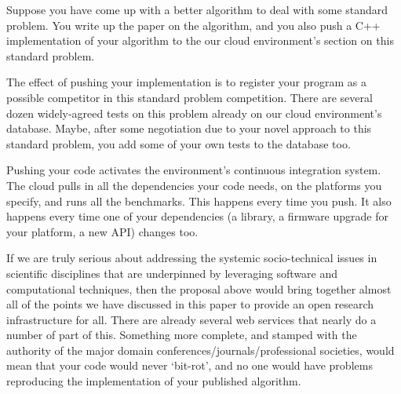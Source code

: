 \documentclass[a4paper,11pt]{article}
\begin{document}
Suppose you have come up with a better
algorithm to deal with some standard problem.  You write up the paper
on the algorithm, and you also push a C++ implementation of your
algorithm to the our cloud environment's section on this standard problem.

The effect of pushing your implementation is to register your program
as a possible competitor in this standard problem competition. There
are several dozen widely-agreed tests on this problem already on our
cloud environment's database. Maybe, after some negotiation due to
your novel approach to this standard problem, you add some of your own
tests to the database too.

Pushing your code activates the environment's continuous integration
system.  The cloud pulls in all the dependencies your code needs, on
the platforms you specify, and runs all the benchmarks. This happens
every time you push. It also happens every time one of your
dependencies (a library, a firmware upgrade for your platform, a new
API) changes too.

If we are truly serious about addressing the systemic socio-technical
issues in scientific disciplines that are underpinned by leveraging
software and computational techniques, then the proposal above would
bring together almost all of the points we have discussed in this
paper to provide an open research infrastructure for all. There are
already several web services that nearly do a number of part of
this. Something more complete, and stamped with the authority of the
major domain conferences/journals/professional societies, would mean
that your code would never `bit-rot', and no one would have problems
reproducing the implementation of your published algorithm.




\end{document}
